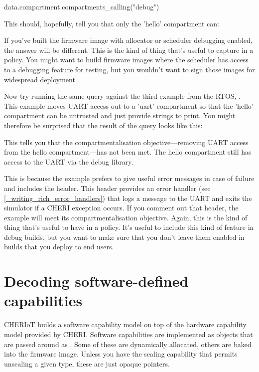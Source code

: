 {\begin{regosnippet}
data.compartment.compartments_calling("debug")
\end{regosnippet}

This should, hopefully, tell you that only the 'hello' compartment can:

\begin{jsonsnippet}
[
  "hello"
]
\end{jsonsnippet}

If you've built the firmware image with allocator or scheduler debugging enabled, the answer will be different.
This is the kind of thing that's useful to capture in a policy.
You might want to build firmware images where the scheduler has access to a debugging feature for testing, but you wouldn't want to sign those images for widespread deployment.

Now try running the same query against the third example from the RTOS, .
This example moves UART access out to a 'uart' compartment so that the 'hello' compartment can be untrusted and just provide strings to print.
You might therefore be surprised that the result of the query looks like this:

\begin{jsonsnippet}
\end{jsonsnippet}

This tells you that the compartmentalisation objective—removing UART access from the hello compartment—has not been met.
The hello compartment still has access to the UART via the debug library.

This is because the example prefers to give useful error messages in case of failure and includes the  header.
This header provides an error handler (see \ref{_writing_rich_error_handlers}) that logs a message to the UART and exits the simulator if a CHERI exception occurs.
If you comment out that header, the example will meet its compartmentalisation objective.
Again, this is the kind of thing that's useful to have in a policy.
It's useful to include this kind of feature in debug builds, but you want to make sure that you don't leave them enabled in builds that you deploy to end users.

\section{Decoding software-defined capabilities}

CHERIoT builds a software capability model on top of the hardware capability model provided by CHERI.
Software capabilities are implemented as objects that are passed around as .
Some of these are dynamically allocated, others are baked into the firmware image.
Unless you have the sealing capability that permits unsealing a given type, these are just opaque pointers.

}
